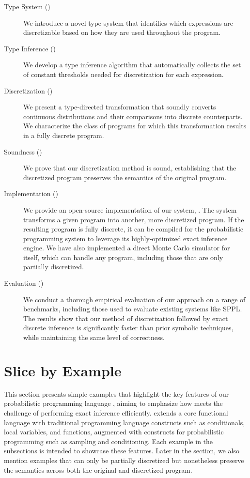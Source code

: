 \documentclass[acmsmall,screen,dvipsnames,x11names,nonacm,anonymous,review]{acmart}
\begin{document}
\begin{description}
    \item[Type System ()] We introduce a novel type system that identifies which expressions are discretizable based on how they are used throughout the program.

    \item[Type Inference ()] We develop a type inference algorithm that automatically collects the set of constant thresholds needed for discretization for each expression.

    \item[Discretization ()] We present a type-directed transformation that soundly converts continuous distributions and their comparisons into discrete counterparts. We characterize the class of programs for which this transformation results in a fully discrete program.

    \item[Soundness ()] We prove that our discretization method is sound, establishing that the discretized program preserves the semantics of the original program.

    \item[Implementation ()] We provide an open-source implementation of our system, \Slice{}. The system transforms a given \Slice{} program into another, more discretized \Slice{} program. If the resulting program is fully discrete, it can be compiled for the \Dice{} probabilistic programming system to leverage its highly-optimized exact inference engine. We have also implemented a direct Monte Carlo simulator for \Slice{} itself, which can handle any program, including those that are only partially discretized.

    \item[Evaluation ()] We conduct a thorough empirical evaluation of our approach on a range of benchmarks, including those used to evaluate existing systems like SPPL\@. The results show that our method of discretization followed by exact discrete inference is significantly faster than prior symbolic techniques, while maintaining the same level of correctness.
\end{description}

\section{Slice by Example}\label{sec:examples}
This section presents simple examples that highlight the key features of our probabilistic programming language \Slice{}, aiming to emphasize how \Slice{} meets the challenge of performing exact inference efficiently. \Slice{} extends a core functional language with traditional programming language constructs such as conditionals, local variables, and functions, augmented with constructs for probabilistic programming such as sampling and conditioning. Each example in the subsections is intended to showcase these features. Later in the section, we also mention examples that can only be partially discretized but nonetheless preserve the semantics across both the original and discretized program.
\end{document}
